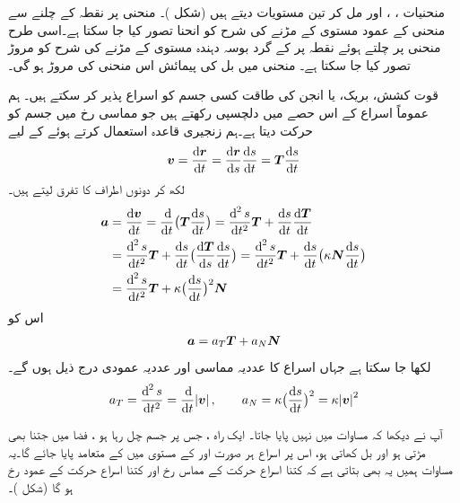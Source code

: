 منحنیات ،  ، اور   مل کر تین  مستویات  دیتے ہیں (شکل )۔ منحنی پر نقطہ  کے چلنے سے منحنی  کے  عمود    مستوی کے مڑنے کی شرح  کو   انحنا   تصور کیا جا سکتا ہے۔اسی طرح  منحنی پر چلتے ہوئے نقطہ  پر  کے گرد بوسہ دہندہ  مستوی  کے  مڑنے کی شرح کو مروڑ  تصور کیا جا سکتا ہے۔  منحنی میں بل کی  پیمائش اس منحنی کی  مروڑ ہو گی۔


قوت کشش، بریک،   یا انجن کی طاقت کسی جسم کو اسراع پذیر کر سکتے ہیں۔  ہم عموماً    اسراع کے اس حصے  میں دلچسپی رکھتے ہیں جو  مماسی  رخ 
  میں    جسم کو    حرکت دیتا ہے۔ہم زنجیری قاعدہ استعمال کرتے ہوئے  کے لیے
\begin{align*}
\kvec{v}=\frac{\dif\kvec{r}}{\dif t}=\frac{\dif\kvec{r}}{\dif s}\frac{\dif s}{\dif t}=\kvec{T}\frac{\dif s}{\dif t}
\end{align*}
لکھ   کر دونوں اطراف کا تفرق  لیتے ہیں۔
\begin{align*}
\kvec{a}&=\frac{\dif\kvec{v}}{\dif t}=\frac{\dif}{\dif t}\big(\kvec{T}\frac{\dif s}{\dif t}\big)=\frac{\dif^{\,2}s}{\dif t^2}\kvec{T}+\frac{\dif s}{\dif t}\frac{\dif \kvec{T}}{\dif t}\\
&=\frac{\dif^{\,2}s}{\dif t^2}\kvec{T}+\frac{\dif s}{\dif t}\big(\frac{\dif\kvec{T}}{\dif s}\frac{\dif s}{\dif t}\big)=\frac{\dif^{\,2}s}{\dif t^2}\kvec{T}+\frac{\dif s}{\dif t}\big(\kappa \kvec{N}\frac{\dif s}{\dif t}\big)\\
&=\frac{\dif^{\,2}s}{\dif t^2}\kvec{T}+\kappa\big(\frac{\dif s}{\dif t}\big)^2\kvec{N}
\end{align*}
اس کو
\begin{align}\label{مساوات_سمتی_تفاعل_اسراع_الف}
{\ensuremath{{\boldsymbol{a}}}}=a_T{{\boldsymbol{T}}}+a_N{{\boldsymbol{N}}}
\end{align}
لکھا جا سکتا ہے جہاں اسراع کا عددیہ مماسی    اور عددیہ عمودی    درج ذیل ہوں گے۔
\begin{align}\label{مساوات_سمتی_تفاعل_اسراع_ب}
a_T=\frac{\dif^{\,2}s}{\dif t^2}=\frac{\dif}{\dif t}\abs{\kvec{v}},\quad\quad  a_N=\kappa\big(\frac{\dif s}{\dif t}\big)^2=\kappa\abs{\kvec{v}}^2
\end{align}

آپ نے دیکھا کہ مساوات  میں  نہیں پایا جاتا۔ ایک راہ ، جس پر  جسم چل رہا ہو ،  فضا میں جتنا بھی مڑتی ہو اور بل کھاتی ہو، اس پر اسراع ہر صورت   اور    کے مستوی میں  کے متعامد  پایا  جائے گا۔یہ مساوات ہمیں یہ بھی بتاتی ہے کہ کتنا اسراع حرکت کے مماس  رخ    اور کتنا  اسراع حرکت کے عمود  رخ     ہو گا  (شکل )۔ 

